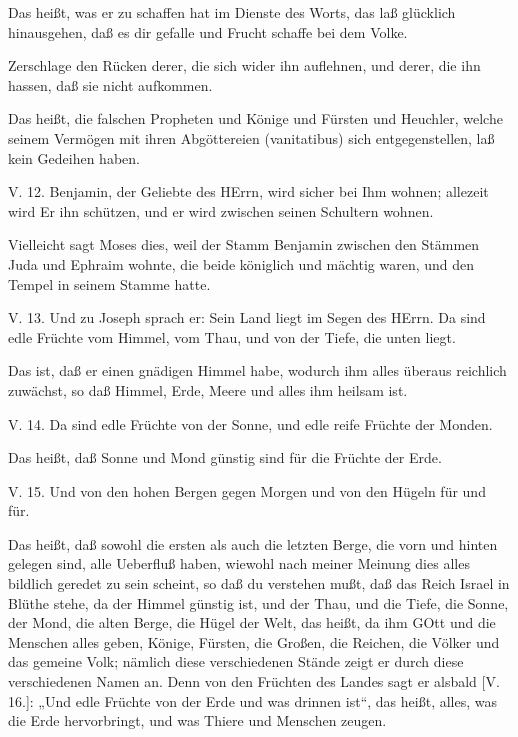Das heißt, was er zu schaffen hat im Dienste des Worts, das laß glücklich hinausgehen, daß es dir gefalle und Frucht schaffe bei dem Volke.

Zerschlage den Rücken derer, die sich wider ihn auflehnen, und derer, die ihn hassen, daß sie nicht aufkommen.

Das heißt, die falschen Propheten und Könige und Fürsten und Heuchler, welche seinem Vermögen mit ihren Abgöttereien (vanitatibus) sich entgegenstellen, laß kein Gedeihen haben.

\begin{schriftzitat}
V. 12. Benjamin, der Geliebte des HErrn, wird sicher bei Ihm wohnen; allezeit wird Er ihn schützen, und er wird zwischen seinen Schultern wohnen.
\end{schriftzitat}

Vielleicht sagt Moses dies, weil der Stamm Benjamin zwischen den Stämmen Juda und Ephraim wohnte, die beide königlich und mächtig waren, und den Tempel in seinem Stamme hatte.

\begin{schriftzitat}
V. 13. Und zu Joseph sprach er: Sein Land liegt im Segen des HErrn. Da sind edle Früchte vom Himmel, vom Thau, und von der Tiefe, die unten liegt.
\end{schriftzitat}

Das ist, daß er einen gnädigen Himmel habe, wodurch ihm alles überaus reichlich zuwächst, so daß Himmel, Erde, Meere und alles ihm heilsam ist.

\begin{schriftzitat}
V. 14. Da sind edle Früchte von der Sonne, und edle reife Früchte der Monden.
\end{schriftzitat}

Das heißt, daß Sonne und Mond günstig sind für die Früchte der Erde.

\begin{schriftzitat}
V. 15. Und von den hohen Bergen gegen Morgen und von den Hügeln für und für.
\end{schriftzitat}

Das heißt, daß sowohl die ersten als auch die letzten Berge, die vorn und hinten gelegen sind, alle Ueberfluß haben, wiewohl nach meiner Meinung dies alles bildlich geredet zu sein scheint, so daß du verstehen mußt, daß das Reich Israel in Blüthe stehe, da der Himmel günstig ist, und der Thau, und die Tiefe, die Sonne, der Mond, die alten Berge, die Hügel der Welt, das heißt, da ihm GOtt und die Menschen alles geben, Könige, Fürsten, die Großen, die Reichen, die Völker und das gemeine Volk; nämlich diese verschiedenen Stände zeigt er durch diese verschiedenen Namen an. Denn von den Früchten des Landes sagt er alsbald [V. 16.]: „Und edle Früchte von der Erde und was drinnen ist“, das heißt, alles, was die Erde hervorbringt, und was Thiere und Menschen zeugen.

